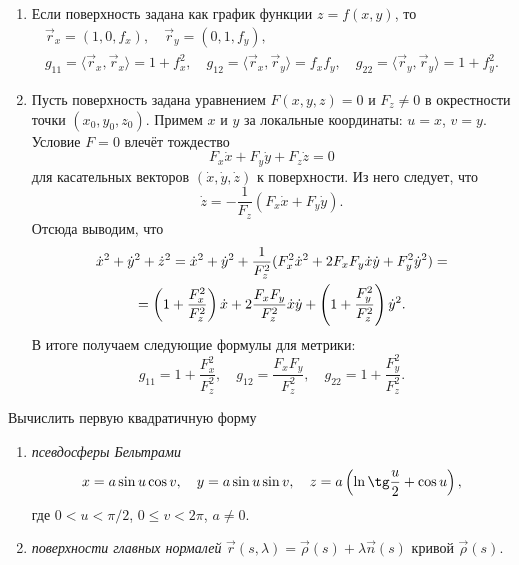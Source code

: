 \begin{example} \label{example:IFormOnSurfaces}
	\begin{enumerate}[nolistsep, label=(\arabic*)]
		\item Если поверхность задана как график функции $z = f(x, y)$, то
			\begin{gather*}
				\vec{r}_x = (1, 0, f_x),\quad\vec{r}_y = (0, 1, f_y),\\
				g_{11} = \langle\vec{r}_x, \vec{r}_x\rangle = 1 + f_x^2,\quad g_{12} = \langle\vec{r}_x, \vec{r}_y\rangle = f_xf_y,\quad g_{22} = \langle\vec{r}_y, \vec{r}_y\rangle = 1 + f_y^2.
			\end{gather*}
		\item Пусть поверхность задана уравнением $F(x, y, z) = 0$ и $F_z \ne 0$ в окрестности точки $(x_0, y_0, z_0)$. Примем $x$ и $y$ за локальные координаты: $u = x$, $v = y$. Условие $F = 0$ влечёт тождество
			\[
				F_x\dot{x} + F_y\dot{y} + F_z\dot{z} = 0
			\]
			для касательных векторов $(\dot{x}, \dot{y}, \dot{z})$ к поверхности. Из него следует, что
			\[
				\dot{z} = -\frac{1}{F_z}(F_x\dot{x} + F_y\dot{y}).
			\]
			Отсюда выводим, что
			\begin{multline*}
				\dot{x}^2 + \dot{y}^2 + \dot{z}^2 = \dot{x}^2 + \dot{y}^2 + \frac{1}{F_z^2}(F_x^2\dot{x}^2 + 2F_xF_y\dot{x}\dot{y} + F_y^2\dot{y}^2) =\\ = \left(1 + \frac{F_x^2}{F_z^2}\right)\dot{x} + 2\frac{F_xF_y}{F_z^2}\dot{x}\dot{y} + \left(1 + \frac{F_y^2}{F_z^2}\right)\dot{y}^2.
			\end{multline*}
			В итоге получаем следующие формулы для метрики:
			\[
				g_{11} = 1 + \frac{F_x^2}{F_z^2},\quad g_{12} = \frac{F_xF_y}{F_z^2},\quad g_{22} = 1 + \frac{F_y^2}{F_z^2}.
			\]
	\end{enumerate}
\end{example}

\begin{problem} \label{problem:FindG}
	Вычислить первую квадратичную форму
	\begin{enumerate}[nolistsep, label=(\arabic*)]
		\item \textit{псевдосферы Бельтрами}
			\[
				x = a\sin u\cos v,\quad y = a\sin u\sin v,\quad z = a\br{\ln\tg\frac{u}{2} + \cos u},
			\]
			где $0 < u < \pi / 2$, $0 \leqslant v < 2\pi$, $a \ne 0$.
		\item \textit{поверхности главных нормалей} $\vec{r}(s, \lambda) = \vec{\rho}(s) + \lambda\vec{n}(s)$ кривой $\vec{\rho}(s)$.
	\end{enumerate}
\end{problem}

